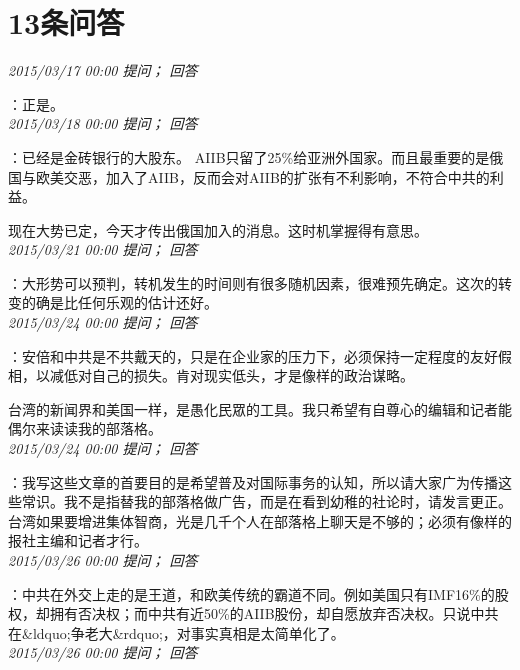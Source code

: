 \documentclass[twocolumn]{ctexart}
\begin{document}
\section{13条问答}

\textit{\hfill\noindent\small 2015/03/17 00:00 提问； 回答}

：正是。\\

\textit{\hfill\noindent\small 2015/03/18 00:00 提问； 回答}

：已经是金砖银行的大股东。 AIIB只留了25\%给亚洲外国家。而且最重要的是俄国与欧美交恶，加入了AIIB，反而会对AIIB的扩张有不利影响，不符合中共的利益。

现在大势已定，今天才传出俄国加入的消息。这时机掌握得有意思。\\

\textit{\hfill\noindent\small 2015/03/21 00:00 提问； 回答}

：大形势可以预判，转机发生的时间则有很多随机因素，很难预先确定。这次的转变的确是比任何乐观的估计还好。\\

\textit{\hfill\noindent\small 2015/03/24 00:00 提问； 回答}

：安倍和中共是不共戴天的，只是在企业家的压力下，必须保持一定程度的友好假相，以减低对自己的损失。肯对现实低头，才是像样的政治谋略。

台湾的新闻界和美国一样，是愚化民眾的工具。我只希望有自尊心的编辑和记者能偶尔来读读我的部落格。\\

\textit{\hfill\noindent\small 2015/03/24 00:00 提问； 回答}

：我写这些文章的首要目的是希望普及对国际事务的认知，所以请大家广为传播这些常识。我不是指替我的部落格做广告，而是在看到幼稚的社论时，请发言更正。台湾如果要增进集体智商，光是几千个人在部落格上聊天是不够的；必须有像样的报社主编和记者才行。\\

\textit{\hfill\noindent\small 2015/03/26 00:00 提问； 回答}

：中共在外交上走的是王道，和欧美传统的霸道不同。例如美国只有IMF16\%的股权，却拥有否决权；而中共有近50\%的AIIB股份，却自愿放弃否决权。只说中共在\&ldquo;争老大\&rdquo;，对事实真相是太简单化了。\\

\textit{\hfill\noindent\small 2015/03/26 00:00 提问； 回答}
\end{document}
